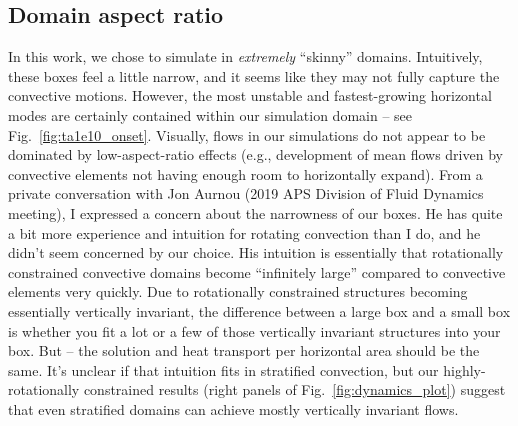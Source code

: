 \subsection{Domain aspect ratio}
In this work, we chose to simulate in \emph{extremely} ``skinny'' domains.
Intuitively, these boxes feel a little narrow, and it seems like they may not fully capture the convective motions.
However, the most unstable and fastest-growing horizontal modes are certainly contained within our simulation domain -- see Fig.~\ref{fig:ta1e10_onset}. 
Visually, flows in our simulations do not appear to be dominated by low-aspect-ratio effects (e.g., development of mean flows driven by convective elements not having enough room to horizontally expand).
From a private conversation with Jon Aurnou (2019 APS Division of Fluid Dynamics meeting), I expressed a concern about the narrowness of our boxes.
He has quite a bit more experience and intuition for rotating convection than I do, and he didn't seem concerned by our choice.
His intuition is essentially that rotationally constrained convective domains become ``infinitely large'' compared to convective elements very quickly.
Due to rotationally constrained structures becoming essentially vertically invariant, the difference between a large box and a small box is whether you fit a lot or a few of those vertically invariant structures into your box.
But -- the solution and heat transport per horizontal area should be the same.
It's unclear if that intuition fits in stratified convection, but our highly-rotationally constrained results (right panels of Fig.~\ref{fig:dynamics_plot}) suggest that even stratified domains can achieve mostly vertically invariant flows.
